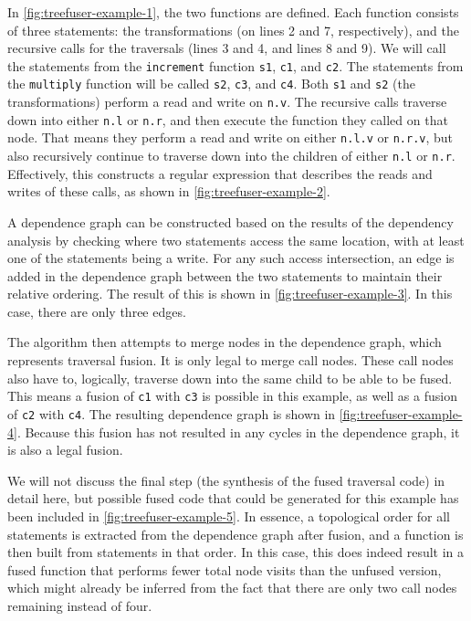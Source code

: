 In \autoref{fig:treefuser-example-1}, the two functions are defined. Each function consists of three statements: the transformations (on lines 2 and 7, respectively), and the recursive calls for the traversals (lines 3 and 4, and lines 8 and 9). We will call the statements from the \texttt{increment} function \texttt{s1}, \texttt{c1}, and \texttt{c2}. The statements from the \texttt{multiply} function will be called \texttt{s2}, \texttt{c3}, and \texttt{c4}. Both \texttt{s1} and \texttt{s2} (the transformations) perform a read and write on \texttt{n.v}. The recursive calls traverse down into either \texttt{n.l} or \texttt{n.r}, and then execute the function they called on that node. That means they perform a read and write on either \texttt{n.l.v} or \texttt{n.r.v}, but also recursively continue to traverse down into the children of either \texttt{n.l} or \texttt{n.r}. Effectively, this constructs a regular expression that describes the reads and writes of these calls, as shown in \autoref{fig:treefuser-example-2}.

A dependence graph can be constructed based on the results of the dependency analysis by checking where two statements access the same location, with at least one of the statements being a write. For any such access intersection, an edge is added in the dependence graph between the two statements to maintain their relative ordering. The result of this is shown in \autoref{fig:treefuser-example-3}. In this case, there are only three edges.

The algorithm then attempts to merge nodes in the dependence graph, which represents traversal fusion. It is only legal to merge call nodes. These call nodes also have to, logically, traverse down into the same child to be able to be fused. This means a fusion of \texttt{c1} with \texttt{c3} is possible in this example, as well as a fusion of \texttt{c2} with \texttt{c4}. The resulting dependence graph is shown in \autoref{fig:treefuser-example-4}. Because this fusion has not resulted in any cycles in the dependence graph, it is also a legal fusion.

We will not discuss the final step (the synthesis of the fused traversal code) in detail here, but possible fused code that could be generated for this example has been included in \autoref{fig:treefuser-example-5}. In essence, a topological order for all statements is extracted from the dependence graph after fusion, and a function is then built from statements in that order. In this case, this does indeed result in a fused function that performs fewer total node visits than the unfused version, which might already be inferred from the fact that there are only two call nodes remaining instead of four.

